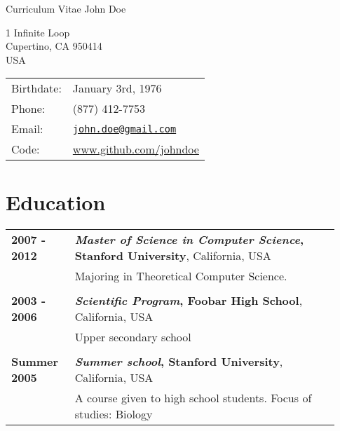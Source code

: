 \documentclass[letterpaper]{article}
\def\name{John Doe}
\def\rightcolumnwidth{0.75\linewidth}
\def\leftcolumnwidth{0.18\linewidth}
\begin{document}
\begin{minipage}{0.7\linewidth}
{\huge Curriculum Vitae} \hfill {\huge \name}
\end{minipage}


\vspace{0.23in}

\begin{minipage}{0.51\linewidth}
  \vspace{-0.2in}
  1 Infinite Loop \\
  Cupertino, CA 950414 \\
  USA
\end{minipage}
\begin{minipage}{0.5\linewidth}
  \begin{tabular}{l l}
    Birthdate: & January 3rd, 1976 \\
    Phone:     & (877) 412-7753 \\
    Email:     & \href{mailto:john.doe@gmail.com}{\tt john.doe@gmail.com} \\
    Code:      & \url{www.github.com/johndoe}
  \end{tabular}
\end{minipage}

\section*{Education}
\begin{tabular}{p{\leftcolumnwidth} p{\rightcolumnwidth}}
  {\bf 2007 - 2012} & {\bf \emph{Master of Science in Computer Science},
                      Stanford University}, California, USA \\
                    & Majoring in Theoretical Computer Science. \\
                    & \\
  {\bf 2003 - 2006} & {\bf \emph{Scientific Program}, Foobar High School},
                      California, USA \\
                    & Upper secondary school \\
                    & \\
  {\bf Summer 2005} & {\bf \emph{Summer school}, Stanford University},
                      California, USA \\
                    & A course given to high school students.  Focus of
                      studies: Biology
\end{tabular}
\end{document}
